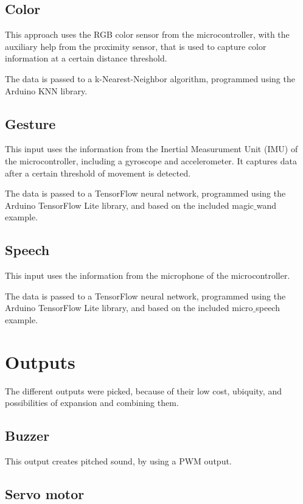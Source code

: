 \subsection{Color}

This approach uses the RGB color sensor from the microcontroller, with the auxiliary help from the proximity sensor, that is used to capture color information at a certain distance threshold.

The data is passed to a k-Nearest-Neighbor algorithm, programmed using the Arduino KNN library.

\subsection{Gesture}

This input uses the information from the Inertial Measurument Unit (IMU) of the microcontroller, including a gyroscope and accelerometer. It captures data after a certain threshold of movement is detected. 

The data is passed to a TensorFlow neural network, programmed using the Arduino TensorFlow Lite library, and based on the included magic$\_$wand example.

\subsection{Speech}

This input uses the information from the microphone of the microcontroller.

The data is passed to a TensorFlow neural network, programmed using the Arduino TensorFlow Lite library, and based on the included micro$\_$speech example.

\section{Outputs}

The different outputs were picked, because of their low cost, ubiquity, and possibilities of expansion and combining them.

\subsection{Buzzer}

This output creates pitched sound, by using a PWM output.

\subsection{Servo motor}

